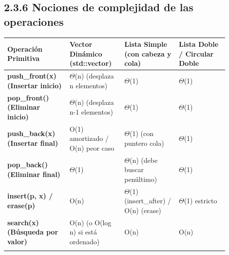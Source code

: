 \documentclass[11pt,letterpaper]{article}
\begin{document}
\vspace{6pt}\par
\subsection*{2.3.6 Nociones de complejidad de las operaciones}
\vspace{4pt}\noindent
\begin{tabular}{>{\raggedright\arraybackslash}p{0.249\linewidth}>{\raggedright\arraybackslash}p{0.222\linewidth}>{\raggedright\arraybackslash}p{0.222\linewidth}>{\raggedright\arraybackslash}p{0.208\linewidth}}
\toprule
\textbf{\color{ipnguinda}Operación Primitiva} & \textbf{\color{ipnguinda}Vector Dinámico (std::vector)} & \textbf{\color{ipnguinda}Lista Simple (con cabeza y cola)} & \textbf{\color{ipnguinda}Lista Doble / Circular Doble} \\
\midrule
\textbf{push\_front(x) (Insertar inicio)} & $\Theta$(n) (desplaza n elementos) & $\Theta$(1) & $\Theta$(1) \\
\addlinespace[3pt]
\textbf{pop\_front() (Eliminar inicio)} & $\Theta$(n) (desplaza n-1 elementos) & $\Theta$(1) & $\Theta$(1) \\
\addlinespace[3pt]
\textbf{push\_back(x) (Insertar final)} & O(1) amortizado / O(n) peor caso & $\Theta$(1) (con puntero cola) & $\Theta$(1) \\
\addlinespace[3pt]
\textbf{pop\_back() (Eliminar final)} & $\Theta$(1) & $\Theta$(n) (debe buscar penúltimo) & $\Theta$(1) \\
\addlinespace[3pt]
\textbf{insert(p, x) / erase(p)} & O(n) & $\Theta$(1) (insert\_after) / O(n) (erase) & $\Theta$(1) estricto \\
\addlinespace[3pt]
\textbf{search(x) (Búsqueda por valor)} & O(n) (o O(log n) si está ordenado) & O(n) & O(n) \\
\addlinespace[3pt]
\bottomrule
\end{tabular}
\vspace{6pt}\par
\end{document}
